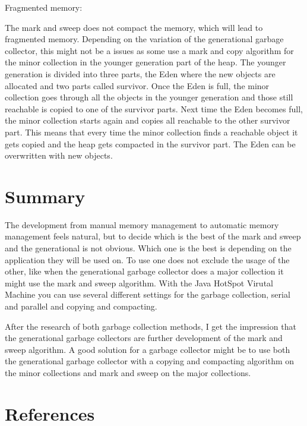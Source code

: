 \documentclass[11pt, a4paper]{article}
\begin{document}
Fragmented memory:

The mark and sweep does not compact the memory, which will lead to fragmented memory\cite{frag}. 
Depending on the variation of the generational garbage collector, this might not be a issues as some use a mark and copy algorithm for the minor collection in the younger generation part of the heap. The younger generation is divided into three parts, the Eden where the new objects are allocated and two parts called survivor. Once the Eden is full, the minor collection goes through all the objects in the younger generation and those still reachable is copied to one of the survivor parts. Next time the Eden becomes full, the minor collection starts again and copies all reachable to the other survivor part. This means that every time the minor collection finds a reachable object it gets copied and the heap gets compacted in the survivor part. The Eden can be overwritten with new objects\cite{javafrag}.


\section{Summary}

The development from manual memory management to automatic memory management feels natural, but to decide which is the best of the mark and sweep and the generational is not obvious. 
Which one is the best is depending on the application they will be used on. 
To use one does not exclude the usage of the other, like when the generational garbage collector does a major collection it might use the mark and sweep algorithm. 
With the Java HotSpot Virutal Machine you can use several different settings for the garbage collection, serial and parallel and copying and compacting\cite{javafrag}. 

After the research of both garbage collection methods, I get the impression that the generational garbage collectors are further development of the mark and sweep algorithm. A good solution for a garbage collector might be to use both the generational garbage collector with a copying and compacting algorithm on the minor collections and mark and sweep on the major collections.


\section{References}

{}

\end{document}

